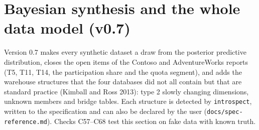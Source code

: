 \section{Bayesian synthesis and the whole data model (v0.7)}\label{sec:v07}
Version 0.7 makes every synthetic dataset a draw from the posterior predictive distribution, closes the open items of the Contoso and AdventureWorks reports (T5, T11, T14, the participation share and the quota segment), and adds the warehouse structures that the four databases did not all contain but that are standard practice (Kimball and Ross 2013): type 2 slowly changing dimensions, unknown members and bridge tables. Each structure is detected by \texttt{introspect}, written to the specification and can also be declared by the user (\texttt{docs/spec-reference.md}). Checks C57--C68 test this section on fake data with known truth.

